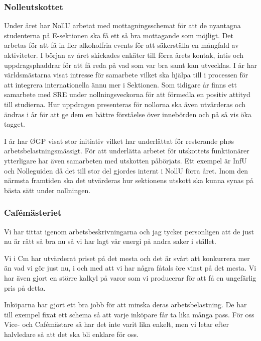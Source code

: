 \documentclass[../_main/handlingar.tex]{subfiles}
\begin{document}
\subsubsection*{Nolleutskottet}

Under året har NollU arbetat med mottagningsschemat för att de nyantagna studenterna på E-sektionen ska få ett så bra mottagande som möjligt. Det arbetas för att få in fler alkoholfria events för att säkerställa en mångfald av aktiviteter. I början av året skickades enkäter till förra årets kontak, intis och uppdragsphaddrar för att få reda på vad som var bra samt kan utvecklas. I år har världsmästarna visat intresse för samarbete vilket ska hjälpa till i processen för att integrera internationella ännu mer i Sektionen. Som tidigare år finns ett samarbete med SRE under nollningsveckorna för att förmedla en positiv attityd till studierna. Hur uppdragen presenteras för nollorna ska även utvärderas och ändras i år för att ge dem en bättre förståelse över innebörden och på så vis öka tagget.

I år har ØGP visat stor initiativ vilket har underlättat för resterande phøs arbetsbelastningsmässigt. För att underlätta arbetet för utskottets funktionärer ytterligare har även samarbeten med utskotten påbörjats. Ett exempel är InfU och Nolleguiden då det till stor del gjordes internt i NollU förra året. Inom den närmsta framtiden ska det utvärderas hur sektionens utskott ska kunna synas på bästa sätt under nollningen.



\subsubsection*{Cafémästeriet}

Vi har tittat igenom arbetsbeskrivningarna och jag tycker personligen att de just nu är rätt så bra nu så vi har lagt vår energi på andra saker i stället.

Vi i Cm har utvärderat priset på det mesta och det är svårt att konkurrera mer än vad vi gör just nu, i och med att vi har några fåtals öre vinst på det mesta. Vi har även gjort en större kalkyl på varor som vi producerar för att få en ungefärlig pris på detta.

Inköparna har gjort ett bra jobb för att minska deras arbetsbelastning. De har till exempel fixat ett schema så att varje inköpare får ta lika många pass. För oss Vice- och Cafémästare så har det inte varit lika enkelt, men vi letar efter halvledare så att det ska bli enklare för oss.
\end{document}
